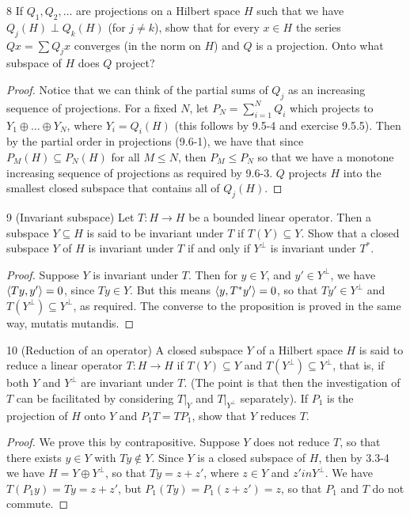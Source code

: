 \begin{exercise}{8}
If $Q_1, Q_2, \dots$ are projections on a Hilbert space $H$ such that we have $Q_j(H) \perp Q_k(H)$ (for $j \neq k$), show that for every $x \in H$ the series $Qx = \sum Q_j x$ converges (in the norm on $H$) and $Q$ is a projection.
Onto what subspace of $H$ does $Q$ project?
\end{exercise}
\begin{proof}
Notice that we can think of the partial sums of $Q_j$ as an increasing sequence of projections.
For a fixed $N$, let $P_N = \sum_{i=1}^N Q_i$ which projects to $Y_1 \oplus \dots \oplus Y_N$, where $Y_i = Q_i(H)$ (this follows by 9.5-4 and exercise 9.5.5).
Then by the partial order in projections (9.6-1), we have that since $P_M(H) \subseteq P_N(H)$ for all $M \leq N$, then $P_M \leq P_N$ so that we have a monotone increasing sequence of projections as required by 9.6-3.
$Q$ projects $H$ into the smallest closed subspace that contains all of $Q_j(H)$.
\end{proof} 

\begin{exercise}{9 (Invariant subspace)}
Let $T: H \to H$ be a bounded linear operator.
Then a subspace $Y \subseteq H$ is said to be invariant under $T$ if $T(Y) \subseteq Y$.
Show that a closed subspace $Y$ of $H$ is invariant under $T$ if and only if $Y^\perp$ is invariant under $T^\ast$.
\end{exercise}
\begin{proof}
Suppose $Y$ is invariant under $T$.
Then for $y \in Y$, and $y' \in Y^\perp$, we have $\langle Ty, y'\rangle = 0$, since $Ty \in Y$.
But this means $\langle y, T^\ast y'\rangle = 0$, so that $Ty' \in Y^\perp$ and $T(Y^\perp) \subseteq Y^\perp$, as required.
The converse to the proposition is proved in the same way, mutatis mutandis.
\end{proof} 

\begin{exercise}{10 (Reduction of an operator)}
A closed subspace $Y$ of a Hilbert space $H$ is said to reduce a linear operator $T: H \to H$ if $T(Y) \subseteq Y$ and $T(Y^\perp) \subseteq Y^\perp$, that is, if both $Y$ and $Y^\perp$ are invariant under $T$.
(The point is that then the investigation of $T$ can be facilitated by considering $T|_Y$ and $T|_{Y^\perp}$ separately).
If $P_1$ is the projection of $H$ onto $Y$ and $P_1 T = T P_1$, show that $Y$ reduces $T$.
\end{exercise}
\begin{proof}
We prove this by contrapositive.
Suppose $Y$ does not reduce $T$, so that there exists $y \in Y$ with $Ty \notin Y$.
Since $Y$ is a closed subspace of $H$, then by 3.3-4 we have $H = Y \oplus Y^\perp$, so that $Ty = z + z'$, where $z \in Y$ and $z' in Y^\perp$.
We have $T (P_1 y) = T y = z + z'$, but $P_1 (T y) = P_1 (z + z') = z$, so that $P_1$ and $T$ do not commute.
\end{proof} 

